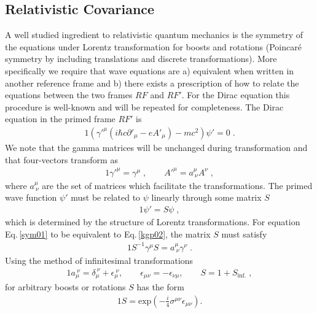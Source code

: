 \documentclass[epj]{svjour}
\begin{document}
\subsection{Relativistic Covariance} \label{sym}
A well studied ingredient to relativistic quantum mechanics is the symmetry of the equations under Lorentz transformation for boosts and rotations (Poincar\'{e} symmetry by including translations and discrete transformations). More specifically we require that wave equations are a) equivalent when written in another reference frame and b) there exists a prescription of how to relate the equations between the two frames $RF$ and $RF'$. For the Dirac equation this procedure is well-known and will be repeated for completeness. The Dirac equation in the primed frame $RF'$ is
\begin{alignat}{1}
\label{sym01} \left(\gamma'^{\mu}\left(i\hbar c\partial'_{\mu}-eA'_{\mu}\right)-mc^{2}\right)\psi'=0\;.
\end{alignat} 
We note that the gamma matrices will be unchanged during transformation and that four-vectors transform as
\begin{alignat}{1}
\label{sym02} \gamma'^{\mu}=\gamma^{\mu}\;, \qquad A'^{\mu}=a^{\mu}_{\ \nu}A^{\nu}\;,
\end{alignat} 
where $a^{\mu}_{\ \nu}$ are the set of matrices which facilitate the transformations. The primed wave function $\psi'$ must be related to $\psi$ linearly through some matrix $S$
\begin{alignat}{1}
\label{sym03} \psi'=S\psi\;,
\end{alignat} 
which is determined by the structure of Lorentz transformations. For equation Eq.\,\eqref{sym01} to be equivalent to Eq.\,\eqref{kgp02}, the matrix $S$ must satisfy
\begin{alignat}{1}
\label{sym04} S^{-1}\gamma^{\mu}S=a^{\mu}_{\ \nu}\gamma^{\nu}\;.
\end{alignat} 
Using the method of infinitesimal transformations
\begin{alignat}{1}
\label{sym05} a^{\ \nu}_{\mu} = \delta^{\ \nu}_{\mu}+\epsilon^{\ \nu}_{\mu}, \qquad \epsilon_{\mu\nu}=-\epsilon_{\nu\mu}, \qquad S = 1+S_{\mathrm{inf.}}\;,
\end{alignat} 
for arbitrary boosts or rotations $S$ has the form
\begin{alignat}{1}
\label{sym06} S = \mathrm{exp}\left(-\frac{i}{4}\sigma^{\mu\nu}\epsilon_{\mu\nu}\right).
\end{alignat} 
\end{document}
